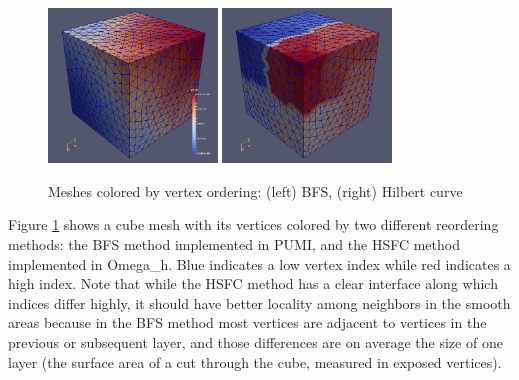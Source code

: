 \begin{figure}
\begin{center}
\includegraphics[width=0.4\textwidth]{bfs.png}
\includegraphics[width=0.4\textwidth]{hilbert.png}
\caption{Meshes colored by vertex ordering:
(left) BFS, (right) Hilbert curve}
\label{fig:reorder}
\end{center}
\end{figure}

Figure \ref{fig:reorder} shows a cube mesh with its vertices colored by
two different reordering methods: the BFS method implemented in PUMI,
and the HSFC method implemented in Omega\_h.
Blue indicates a low vertex index while red indicates a high index.
Note that while the HSFC method has a clear interface along which
indices differ highly, it should have better locality among neighbors
in the smooth areas because in the BFS method most vertices are adjacent
to vertices in the previous or subsequent layer, and those differences
are on average the size of one layer (the surface area of a cut through
the cube, measured in exposed vertices).

